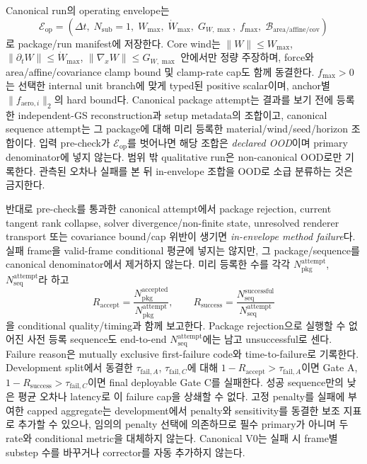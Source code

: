 \documentclass[11pt]{article}
\begin{document}
Canonical run의 operating envelope는
\begin{equation}
  \mathcal E_{\mathrm{op}}
  =
  \left(
    \Delta t,\;N_{\mathrm{sub}}=1,\;W_{\max},\;\dot W_{\max},\;G_{W,\max},\;
    f_{\max},\;\mathcal B_{\mathrm{area/affine/cov}}
  \right)
  \label{eq:minimal-operating-envelope}
\end{equation}
로 package/run manifest에 저장한다. Core wind는
\(\|W\|\leq W_{\max}\), \(\|\partial_tW\|\leq\dot W_{\max}\),
\(\|\nabla_xW\|\leq G_{W,\max}\) 안에서만 정량 주장하며,
force와 area/affine/covariance clamp bound 및 clamp-rate cap도 함께 동결한다.
\(f_{\max}>0\)는 선택한 internal unit branch에 맞게 typed된 positive scalar이며,
anchor별 \(\|f_{\mathrm{aero},i}\|_2\)의 hard bound다.
Canonical package attempt는 결과를 보기 전에 등록한 independent-GS reconstruction과 setup metadata의
조합이고, canonical sequence attempt는 그 package에 대해 미리 등록한 material/wind/seed/horizon 조합이다.
입력 pre-check가 \(\mathcal E_{\mathrm{op}}\)를 벗어나면 해당 조합은 \emph{declared OOD}이며 primary
denominator에 넣지 않는다. 범위 밖 qualitative run은 non-canonical OOD로만 기록한다.
관측된 오차나 실패를 본 뒤 in-envelope 조합을 OOD로 소급 분류하는 것은 금지한다.

반대로 pre-check를 통과한 canonical attempt에서 package rejection, current tangent rank collapse,
solver divergence/non-finite state, unresolved renderer transport 또는 covariance bound/cap 위반이 생기면
\emph{in-envelope method failure}다. 실패 frame을 valid-frame conditional 평균에 넣지는 않지만,
그 package/sequence를 canonical denominator에서 제거하지 않는다. 미리 등록한 수를 각각
\(N_{\mathrm{pkg}}^{\mathrm{attempt}}\), \(N_{\mathrm{seq}}^{\mathrm{attempt}}\)라 하고
\begin{equation}
  R_{\mathrm{accept}}
  =\frac{N_{\mathrm{pkg}}^{\mathrm{accepted}}}
         {N_{\mathrm{pkg}}^{\mathrm{attempt}}},\qquad
  R_{\mathrm{success}}
  =\frac{N_{\mathrm{seq}}^{\mathrm{successful}}}
         {N_{\mathrm{seq}}^{\mathrm{attempt}}}
  \label{eq:minimal-attempt-success-contract}
\end{equation}
을 conditional quality/timing과 함께 보고한다. Package rejection으로 실행할 수 없어진 사전 등록
sequence도 end-to-end \(N_{\mathrm{seq}}^{\mathrm{attempt}}\)에는 남고 unsuccessful로 센다.
Failure reason은 mutually exclusive first-failure code와 time-to-failure로 기록한다.
Development split에서 동결한 \(\tau_{\mathrm{fail},A}\), \(\tau_{\mathrm{fail},C}\)에 대해
\(1-R_{\mathrm{accept}}>\tau_{\mathrm{fail},A}\)이면 Gate A,
\(1-R_{\mathrm{success}}>\tau_{\mathrm{fail},C}\)이면 final deployable Gate C를 실패한다.
성공 sequence만의 낮은 평균 오차나 latency로 이 failure cap을 상쇄할 수 없다.
고정 penalty를 실패에 부여한 capped aggregate는 development에서 penalty와 sensitivity를 동결한
보조 지표로 추가할 수 있으나, 임의의 penalty 선택에 의존하므로 필수 primary가 아니며
두 rate와 conditional metric을 대체하지 않는다.
Canonical V0는 실패 시 frame별 substep 수를 바꾸거나 corrector를 자동 추가하지 않는다.
\end{document}
